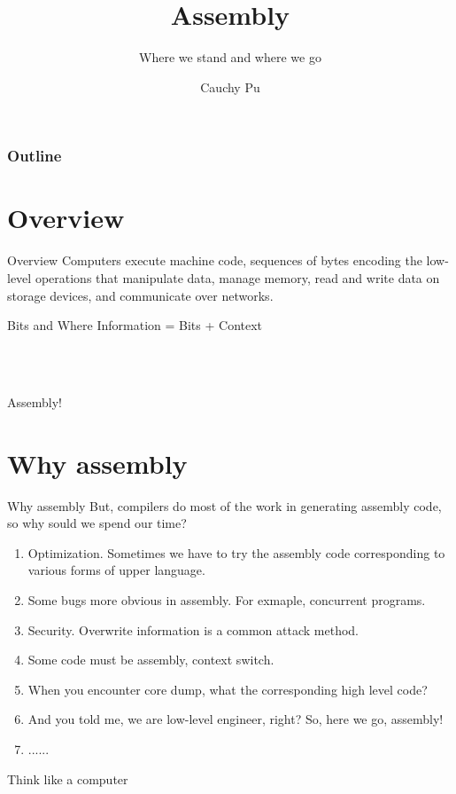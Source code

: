 \documentclass[UKenglish]{beamer}
\author{Cauchy Pu}
\title{Assembly}
\subtitle{Where we stand and where we go}
\begin{document}
%
%

\begin{frame}
\frametitle{Outline}
\tableofcontents
\end{frame}

\section{Overview}
\begin{frame}{Overview}
  Computers execute machine code, sequences of bytes encoding the low-level operations
  that manipulate data, manage memory, read and write data on storage devices, and
  communicate over networks.

  \begin{alertblock}{Bits and Where}
   Information = Bits + Context
 \end{alertblock}

 \begin{center}
   \\ \\
 \end{center}

 \begin{center}
   \vspace{1cm}
   \Huge Assembly!
 \end{center}
\end{frame}


\section{Why assembly}
\begin{frame}{Why assembly}
  But, compilers do most of the work in generating assembly code, so why sould we spend
  our time?
  \begin{enumerate}
  \item Optimization. Sometimes we have to try the assembly code corresponding to various
    forms of upper language.
  \item Some bugs more obvious in assembly. For exmaple, concurrent programs.
  \item Security. Overwrite information is a common attack method.
  \item Some code must be assembly, context switch.
  \item When you encounter core dump, what the corresponding high level code?
  \item And you told me, we are low-level engineer, right? So, here we go, assembly!
  \item ......
  \end{enumerate}
   \begin{center}
   \Huge Think like a computer
 \end{center}
\end{frame}
\end{document}
